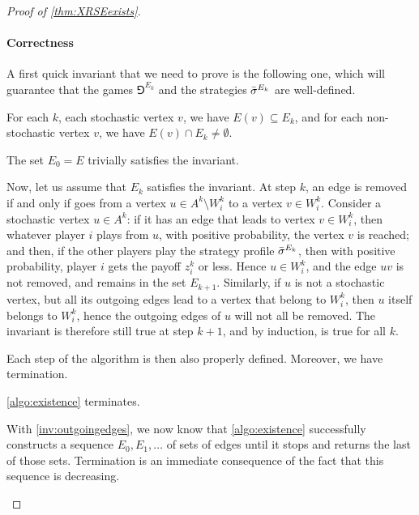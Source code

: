 \begin{proof}[Proof of \cref{thm:XRSEexists}]
    \paragraph*{Correctness} A first quick invariant that we need to prove is the following one, which will guarantee that the games $\Game^{E_k}$ and the strategies ${\bar{\sigma}}^{E_k}$ are well-defined.

    \begin{invariant}\label{inv:outgoingedges}
        For each $k$, each stochastic vertex $v$, we have $E(v) \subseteq E_k$, and for each non-stochastic vertex $v$, we have $E(v) \cap E_k \neq \emptyset$.
    \end{invariant}
    
\begin{claimproof}
    The set $E_0 = E$ trivially satisfies the invariant.

    Now, let us assume that $E_k$ satisfies the invariant.
    At step $k$, an edge is removed if and only if goes from a vertex $u \in A^k \setminus W^k_i$ to a vertex $v \in W^k_i$.
    Consider a stochastic vertex $u \in A^k$: if it has an edge that leads to vertex $v \in W^k_i$, then whatever player $i$ plays from $u$, with positive probability, the vertex $v$ is reached; and then, if the other players play the strategy profile ${\bar{\sigma}}^{E_k}$, then with positive probability, player $i$ gets the payoff $z^k_i$ or less.
    Hence $u \in W_i^k$, and the edge $uv$ is not removed, and remains in the set $E_{k+1}$.
    Similarly, if $u$ is not a stochastic vertex, but all its outgoing edges lead to a vertex that belong to $W_i^k$, then $u$ itself belongs to $W_i^k$, hence the outgoing edges of $u$ will not all be removed.
    The invariant is therefore still true at step $k+1$, and by induction, is true for all $k$.
\end{claimproof}
    
Each step of the algorithm is then also properly defined.
Moreover, we have termination.

\begin{proposition}
    \cref{algo:existence} terminates.
\end{proposition}

\begin{claimproof}
    With \cref{inv:outgoingedges}, we now know that \cref{algo:existence} successfully constructs a sequence $E_0, E_1, \dots$ of sets of edges until it stops and returns the last of those sets.
    Termination is an immediate consequence of the fact that this sequence is decreasing.


\end{claimproof}
\end{proof}
